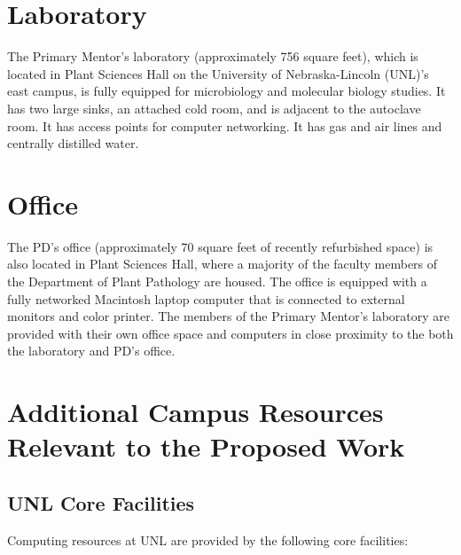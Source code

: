\documentclass[12pt,letterpaper]{article}
\title{\ruleline{Facilities / Other Resources}}
\begin{document}
\maketitle

\section{Laboratory}

The Primary Mentor's laboratory (approximately 756 square feet), which is located in Plant Sciences Hall on the University of Nebraska-Lincoln (UNL)'s east campus, is fully equipped for microbiology and molecular biology studies. It has two large sinks, an attached cold room, and is adjacent to the autoclave room. It has access points for computer networking. It has gas and air lines and centrally distilled water.

\section{Office}

The PD's office (approximately 70 square feet of recently refurbished space) is also located in Plant Sciences Hall, where a majority of the faculty members of the Department of Plant Pathology are housed. The office is equipped with a fully networked Macintosh laptop computer that is connected to external monitors and color printer. The members of the Primary Mentor's laboratory are provided with their own office space and computers in close proximity to the both the laboratory and PD's office.

\section{Additional Campus Resources Relevant to the Proposed Work}

\subsection{UNL Core Facilities}

Computing resources at UNL are provided by the following core facilities:
\end{document}
